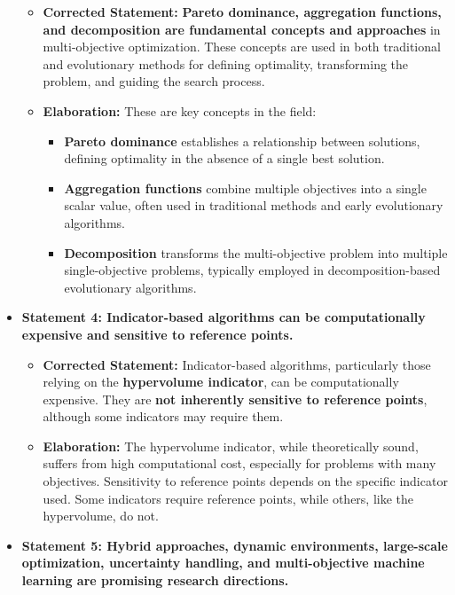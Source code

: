 \documentclass[
]{article}
\begin{document}
\begin{itemize}
  \begin{itemize}
  
  \item
    \textbf{Corrected Statement:} \textbf{Pareto dominance, aggregation
    functions, and decomposition are fundamental concepts and
    approaches} in multi-objective optimization. These concepts are used
    in both traditional and evolutionary methods for defining
    optimality, transforming the problem, and guiding the search
    process.
  \item
    \textbf{Elaboration:} These are key concepts in the field:

    \begin{itemize}
    
    \item
      \textbf{Pareto dominance} establishes a relationship between
      solutions, defining optimality in the absence of a single best
      solution.
    \item
      \textbf{Aggregation functions} combine multiple objectives into a
      single scalar value, often used in traditional methods and early
      evolutionary algorithms.
    \item
      \textbf{Decomposition} transforms the multi-objective problem into
      multiple single-objective problems, typically employed in
      decomposition-based evolutionary algorithms.
    \end{itemize}
  \end{itemize}
\item
  \textbf{Statement 4: Indicator-based algorithms can be computationally
  expensive and sensitive to reference points.}

  \begin{itemize}
  
  \item
    \textbf{Corrected Statement:} Indicator-based algorithms,
    particularly those relying on the \textbf{hypervolume indicator},
    can be computationally expensive. They are \textbf{not inherently
    sensitive to reference points}, although some indicators may require
    them.
  \item
    \textbf{Elaboration:} The hypervolume indicator, while theoretically
    sound, suffers from high computational cost, especially for problems
    with many objectives. Sensitivity to reference points depends on the
    specific indicator used. Some indicators require reference points,
    while others, like the hypervolume, do not.
  \end{itemize}
\item
  \textbf{Statement 5: Hybrid approaches, dynamic environments,
  large-scale optimization, uncertainty handling, and multi-objective
  machine learning are promising research directions.}


\end{itemize}
\end{document}
